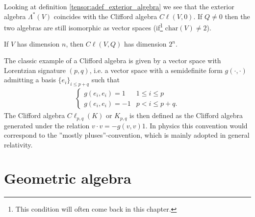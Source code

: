     \begin{remark}
        Looking at definition \ref{tensor:adef_exterior_algebra} we see that the exterior algebra $\Lambda^*(V)$ coincides with the Clifford algebra $C\ell(V, 0)$. If $Q\neq0$ then the two algebras are still isomorphic as vector spaces (if\footnote{This condition will often come back in this chapter.} $\text{char}(V)\neq2$).
    \end{remark}

    \begin{property}[Dimension]
        If $V$ has dimension $n$, then $C\ell(V, Q)$ has dimension $2^n$.
    \end{property}

    \begin{example}
        The classic example of a Clifford algebra is given by a vector space with Lorentzian signature $(p, q)$, i.e. a vector space with a semidefinite form $g(\cdot, \cdot)$ admitting a basis $\{e_i\}_{i\leq p+q}$ such that
        \begin{gather}
            \begin{cases}
                g(e_i, e_i) = 1 & 1\leq i\leq p\\
                g(e_i, e_i) = -1 & p<i\leq p+q.
            \end{cases}
        \end{gather}
        The Clifford algebra $C\ell_{p,q}(K)$ or $K_{p, q}$ is then defined as the Clifford algebra generated under the relation $v\cdot v = -g(v, v)1$. In physics this convention would correspond to the ''mostly pluses''-convention, which is mainly adopted in general relativity.
    \end{example}

\section{Geometric algebra}


